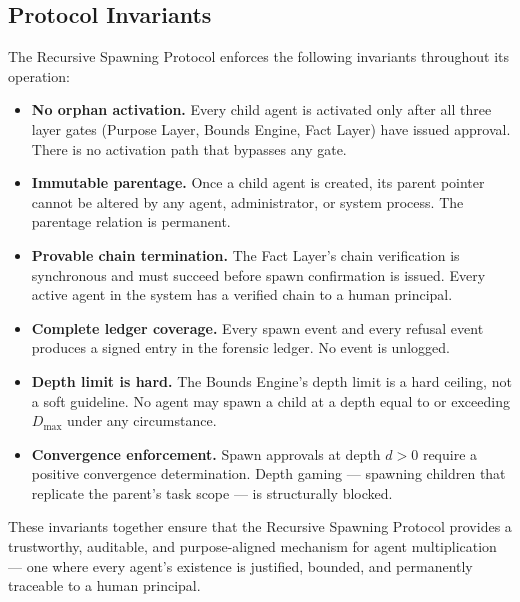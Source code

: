 \subsection{Protocol Invariants}

The Recursive Spawning Protocol enforces the following invariants throughout its operation:

\begin{itemize}
    \item \textbf{No orphan activation.} Every child agent is activated only after all three layer gates (Purpose Layer, Bounds Engine, Fact Layer) have issued approval. There is no activation path that bypasses any gate.
    \item \textbf{Immutable parentage.} Once a child agent is created, its parent pointer cannot be altered by any agent, administrator, or system process. The parentage relation is permanent.
    \item \textbf{Provable chain termination.} The Fact Layer's chain verification is synchronous and must succeed before spawn confirmation is issued. Every active agent in the system has a verified chain to a human principal.
    \item \textbf{Complete ledger coverage.} Every spawn event and every refusal event produces a signed entry in the forensic ledger. No event is unlogged.
    \item \textbf{Depth limit is hard.} The Bounds Engine's depth limit is a hard ceiling, not a soft guideline. No agent may spawn a child at a depth equal to or exceeding $D_{\max}$ under any circumstance.
    \item \textbf{Convergence enforcement.} Spawn approvals at depth $d > 0$ require a positive convergence determination. Depth gaming — spawning children that replicate the parent's task scope — is structurally blocked.
\end{itemize}

These invariants together ensure that the Recursive Spawning Protocol provides a trustworthy, auditable, and purpose-aligned mechanism for agent multiplication — one where every agent's existence is justified, bounded, and permanently traceable to a human principal.